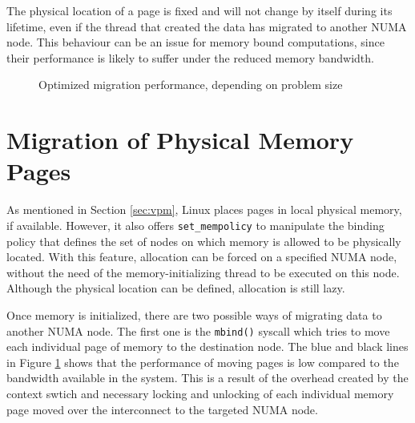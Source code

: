 The physical location of a page is fixed and will not change by itself during its lifetime, even if the thread that created the data has migrated to another NUMA node. This behaviour can be an issue for memory bound computations, since their performance is likely to suffer under the reduced memory bandwidth. \cite{Linux:Memdoc}
\begin{figure}[hbtp]
	\caption{Optimized migration performance, depending on problem size}
	\label{f:datamig}
\end{figure}
\section{Migration of Physical Memory Pages}
As mentioned in Section \ref{sec:vpm}, Linux places pages in local physical memory, if available. However, it also offers \verb|set_mempolicy| to manipulate the binding policy that defines the set of nodes on which memory is
allowed to be physically located. With this feature, allocation can be forced on a specified NUMA node, without the need of the memory-initializing thread to be executed on this node. Although the physical location can be defined, allocation is still lazy.

Once memory is initialized, there are two possible ways of migrating data to another NUMA node. The first one
is the \verb|mbind()| syscall which tries to move each individual page of memory to the destination node.
The blue and black lines in Figure \ref{f:datamig} shows that the performance of moving pages is low compared to the
bandwidth available in the system. This is a result of
the overhead created by the context swtich and necessary locking and unlocking of each individual memory page moved over the interconnect to the targeted NUMA node.

